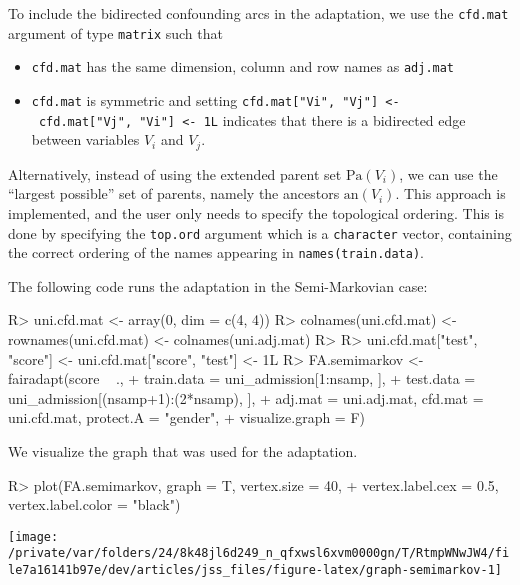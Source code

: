 \documentclass[
  notitle]{jss}
\providecommand{\tightlist}{%
  \setlength{\itemsep}{0pt}\setlength{\parskip}{0pt}}
\begin{document}
To include the bidirected confounding arcs in the adaptation, we use the
\texttt{cfd.mat} argument of type \texttt{matrix} such that

\begin{itemize}
\tightlist
\item
  \texttt{cfd.mat} has the same dimension, column and row names as
  \texttt{adj.mat}
\item
  \texttt{cfd.mat} is symmetric and setting
  \texttt{cfd.mat{[}"Vi",\ "Vj"{]}\ \textless{}-\ cfd.mat{[}"Vj",\ "Vi"{]}\ \textless{}-\ 1L}
  indicates that there is a bidirected edge between variables \(V_i\)
  and \(V_j\).
\end{itemize}

Alternatively, instead of using the extended parent set
\(\mathrm{Pa}(V_i)\), we can use the ``largest possible'' set of
parents, namely the ancestors \(\mathrm{an}(V_i)\). This approach is
implemented, and the user only needs to specify the topological
ordering. This is done by specifying the \texttt{top.ord} argument which
is a \texttt{character} vector, containing the correct ordering of the
names appearing in \texttt{names(train.data)}.

The following code runs the adaptation in the Semi-Markovian case:

\begin{CodeChunk}
\begin{CodeInput}
R> uni.cfd.mat <- array(0, dim = c(4, 4))
R> colnames(uni.cfd.mat) <- rownames(uni.cfd.mat) <- colnames(uni.adj.mat)
R> 
R> uni.cfd.mat["test", "score"] <- uni.cfd.mat["score", "test"] <- 1L
R> FA.semimarkov <- fairadapt(score ~ .,
+   train.data = uni_admission[1:nsamp, ],
+   test.data = uni_admission[(nsamp+1):(2*nsamp), ],
+   adj.mat = uni.adj.mat, cfd.mat = uni.cfd.mat, protect.A = "gender",
+   visualize.graph = F)
\end{CodeInput}
\end{CodeChunk}

We visualize the graph that was used for the adaptation.

\begin{CodeChunk}
\begin{CodeInput}
R> plot(FA.semimarkov, graph = T, vertex.size = 40,
+   vertex.label.cex = 0.5, vertex.label.color = "black")
\end{CodeInput}


\begin{center}\texttt{[image: /private/var/folders/24/8k48jl6d249\_n\_qfxwsl6xvm0000gn/T/RtmpWNwJW4/file7a16141b97e/dev/articles/jss\_files/figure-latex/graph-semimarkov-1]} \end{center}

\end{CodeChunk}
\end{document}
